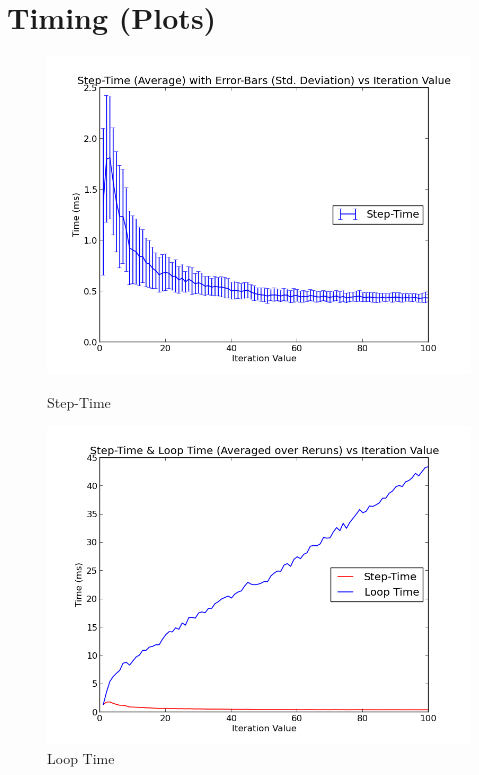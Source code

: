 \documentclass [a4paper, 11pt] {article}
\begin{document}
\section {Timing (Plots)}

\begin{figure}[htbp]
  \begin{minipage}{0.5\linewidth}
    \centering
    \includegraphics[width=\linewidth]{doc/images/plot05}
    \caption{Step-Time}
  \end{minipage}
  \begin{minipage}{0.5\linewidth}
    \centering
    \includegraphics[width=\linewidth]{doc/images/plot01}
    \caption{Loop Time}
  \end{minipage}
\end{figure}
\end{document}
